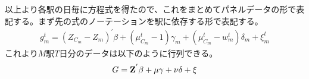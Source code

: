 \documentclass{jsarticle}
\begin{document}
以上より各駅の日毎に方程式を得たので、これをまとめてパネルデータの形で表記する。まず先の式のノーテーションを駅に依存する形で表記する。
\begin{align*}
	g_m^t = (Z_{C_m} - Z_m)^{'} \beta + \left(\mu_{C_m}^t-1\right)\gamma_m + (\mu_{C_m}^t - w_m^t)\delta_m + \xi_m^t
\end{align*}
これより$M$駅$T$日分のデータは以下のように行列できる。
\begin{align*}
	G = {\bf Z}^{'}\beta + {\bf \mu} \gamma + {\bf \nu} \delta + \xi
\end{align*}
\end{document}
